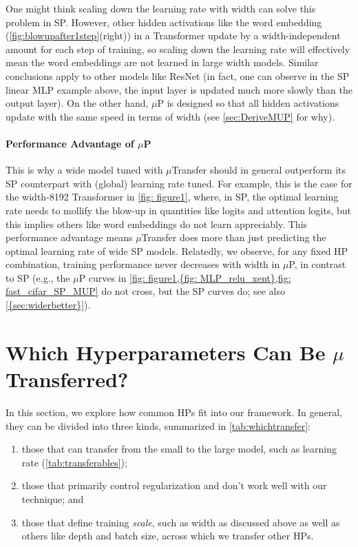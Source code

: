 \documentclass{article}
\theoremstyle{definition}
\begin{document}
  One might think scaling down the learning rate with width can solve this problem in SP.
  However, other hidden activations like the word embedding (\cref{fig:blowupafter1step}(right)) in a Transformer update by a width-independent amount for each step of training, so scaling down the learning rate will effectively mean the word embeddings are not learned in large width models.
  Similar conclusions apply to other models like ResNet (in fact, one can observe in the SP linear MLP example above, the input layer is updated much more slowly than the output layer).
  On the other hand, $\mu$P is designed so that all hidden activations update with the same speed in terms of width (see \cref{sec:DeriveMUP} for why). 
  
  \paragraph{Performance Advantage of $\mu$P}
  This is why a wide model tuned with $\mu$Transfer should in general outperform its SP counterpart with (global) learning rate tuned.
  For example, this is the case for the width-8192 Transformer in \cref{fig: figure1}, where, in SP, the optimal learning rate needs to mollify the blow-up in quantities like logits and attention logits, but this implies others like word embeddings do not learn appreciably.
  This performance advantage means $\mu$Transfer does more than just predicting the optimal learning rate of wide SP models.
  Relatedly, we observe, for any fixed HP combination, training performance never decreases with width in $\mu$P, in contrast to SP (e.g., the $\mu$P curves in \cref{fig: figure1,{fig: MLP_relu_xent},fig: fast_cifar_SP_MUP} do not cross, but the SP curves do; see also \cref{{sec:widerbetter}}).

\section{Which Hyperparameters Can Be \texorpdfstring{$\mu$}{mu}Transferred?}
\label{sec:whichtransfer?}

In this section, we explore how common HPs fit into our framework.
In general, they can be divided into three kinds, summarized in \cref{tab:whichtransfer}: 
\begin{enumerate}
    \item those that can transfer from the small to the large model, such as learning rate (\cref{tab:transferables});
    \item those that primarily control regularization and don't work well with our technique; and
    \item those that define training \emph{scale}, such as width as discussed above as well as others like depth and batch size, across which we transfer other HPs.
\end{enumerate}
\end{document}
